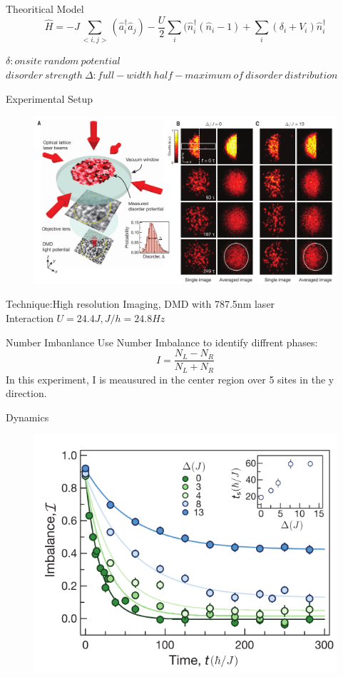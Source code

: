 \documentclass{beamer}
\begin{document}
\begin{frame}
  \begin{block}{Theoritical Model}
  $$\hat{H}=-J\sum_{<i,j>}(\hat{a}_{i}^{\dagger}\hat{a}_{j})-\frac{U}{2}\sum_{i}(\hat{n}_{i}^{\dagger}(\hat{n}_{i}-1)+\sum_i(\delta_i+V_i)\hat{n}_i^{\dagger}$$
  \end{block}
$\delta:onsite\ random\ potential$
$disorder\ strength\ \Delta:full-width\ half-maximum\ of\ disorder\ distribution$
\end{frame}

\begin{frame}{Experimental Setup}
  \begin{figure}
  \includegraphics[width=0.8\linewidth]{2dset}
  \end{figure}
  \small{Technique:High resolution Imaging, DMD with 787.5nm laser}\\
  \small{Interaction $U=24.4J, J/h=24.8Hz$}
\end{frame}

\begin{frame}{Number Imbanlance}
  Use Number Imbalance to identify diffrent phases:
  $$I=\frac{N_L-N_R}{N_L+N_R}$$
  In this experiment, I is meausured in the center region over 5 sites in the y direction.
\end{frame}

\begin{frame}{Dynamics}
  \begin{figure}
  \includegraphics[width=0.8\linewidth]{2ddy}
  \end{figure}
\end{frame}
\end{document}
